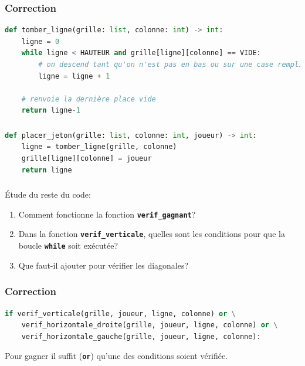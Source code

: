 \documentclass[svgnames,11pt]{beamer}
\begin{document}
\begin{frame}[fragile]
    \frametitle{Correction}

\begin{center}
\begin{lstlisting}[language=Python , basicstyle=\ttfamily\small, xleftmargin=1em, xrightmargin=-1em]
def tomber_ligne(grille: list, colonne: int) -> int:
    ligne = 0
    while ligne < HAUTEUR and grille[ligne][colonne] == VIDE:
        # on descend tant qu'on n'est pas en bas ou sur une case remplie
        ligne = ligne + 1

    # renvoie la dernière place vide
    return ligne-1
\end{lstlisting}
\label{CODE}
\end{center}    

\end{frame}
\begin{frame}[fragile]
    \frametitle{}

\begin{center}
\begin{lstlisting}[language=Python , basicstyle=\ttfamily\small, xleftmargin=.5em, xrightmargin=-4.5em]
def placer_jeton(grille: list, colonne: int, joueur) -> int:
    ligne = tomber_ligne(grille, colonne)
    grille[ligne][colonne] = joueur
    return ligne
\end{lstlisting}
\label{CODE}
\end{center}   

\end{frame}
\begin{frame}
    \frametitle{}

\begin{activite}
Étude du reste du code:
\begin{enumerate}
    \item Comment fonctionne la fonction \textbf{\texttt{verif\_gagnant}}?
    \item Dans la fonction \textbf{\texttt{verif\_verticale}}, quelles sont les conditions pour que la boucle \textbf{\texttt{while}} soit exécutée?
    \item Que faut-il ajouter pour vérifier les diagonales?
\end{enumerate}
\end{activite}

\end{frame}
\begin{frame}[fragile]
    \frametitle{Correction}

    \begin{center}
    \begin{lstlisting}[language=Python , basicstyle=\ttfamily\small, xleftmargin=.5em, xrightmargin=-1.5em]
if verif_verticale(grille, joueur, ligne, colonne) or \
    verif_horizontale_droite(grille, joueur, ligne, colonne) or \
    verif_horizontale_gauche(grille, joueur, ligne, colonne):
\end{lstlisting}
    \captionof{code}{Gagnant?}
    \label{CODE}
    \end{center}
Pour gagner il suffit (\textbf{\texttt{or}}) qu'une des conditions soient vérifiée.
\end{frame}
\end{document}
